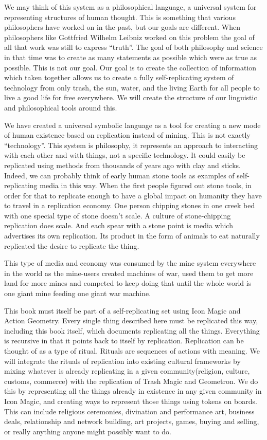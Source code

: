 We may think of this system as a philosophical language, a universal
system for representing structures of human thought. This is something
that various philosophers have worked on in the past, but our goals are
different. When philosophers like Gottfried Wilhelm Leibniz worked on
this problem the goal of all that work was still to express ``truth''.
The goal of both philosophy and science in that time was to create as
many statements as possible which were as true as possible. This is not
our goal. Our goal is to create the collection of information which
taken together allows us to create a fully self-replicating system of
technology from only trash, the sun, water, and the living Earth for all
people to live a good life for free everywhere. We will create the
structure of our linguistic and philosophical tools around this.

We have created a universal symbolic language as a tool for creating a
new mode of human existence based on replication instead of mining. This
is not exactly ``technology''. This system is philosophy, it represents
an approach to interacting with each other and with things, not a
specific technology. It could easily be replicated using methods from
thousands of years ago with clay and sticks. Indeed, we can probably
think of early human stone tools as examples of self-replicating media
in this way. When the first people figured out stone tools, in order for
that to replicate enough to have a global impact on humanity they have
to travel in a replication economy. One person chipping stones in one
creek bed with one special type of stone doesn't scale. A culture of
stone-chipping replication does scale. And each spear with a stone point
is media which advertises its own replication. Its product in the form
of animals to eat naturally replicated the desire to replicate the
thing.

This type of media and economy was consumed by the mine system
everywhere in the world as the mine-users created machines of war, used
them to get more land for more mines and competed to keep doing that
until the whole world is one giant mine feeding one giant war machine.

This book must itself be part of a self-replicating set using Icon Magic
and Action Geometry. Every single thing described here must be
replicated this way, including this book itself, which documents
replicating all the things. Everything is recursive in that it points
back to itself by replication. Replication can be thought of as a type
of ritual. Rituals are sequences of actions with meaning. We will
integrate the rituals of replication into existing cultural frameworks
by mixing whatever is already replicating in a given community(religion,
culture, customs, commerce) with the replication of Trash Magic and
Geometron. We do this by representing all the things already in
existence in any given community in Icon Magic, and creating ways to
represent those things using tokens on boards. This can include
religious ceremonies, divination and performance art, business deals,
relationship and network building, art projects, games, buying and
selling, or really anything anyone might possibly want to do.

